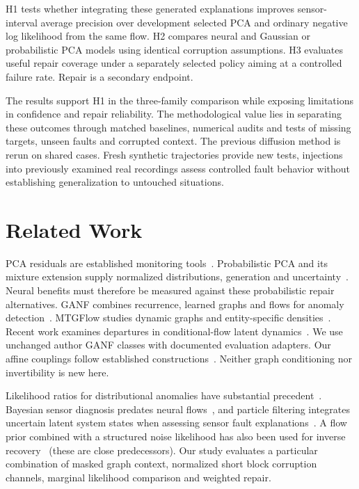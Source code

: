 \documentclass[conference]{IEEEtran}
\newcommand{\1}{\mathbf{1}}
\begin{document}
H1 tests whether integrating these generated explanations improves sensor-interval average precision over development selected PCA and ordinary negative log likelihood from the same flow. H2 compares neural and Gaussian or probabilistic PCA models using identical corruption assumptions. H3 evaluates useful repair coverage under a separately selected policy aiming at a controlled failure rate. Repair is a secondary endpoint.

The results support H1 in the three-family comparison while exposing limitations in confidence and repair reliability. The methodological value lies in separating these outcomes through matched baselines, numerical audits and tests of missing targets, unseen faults and corrupted context. The previous diffusion method is rerun on shared cases. Fresh synthetic trajectories provide new tests, injections into previously examined real recordings assess controlled fault behavior without establishing generalization to untouched situations.



\section{Related Work}
PCA residuals are established monitoring tools~\cite{pca}. Probabilistic PCA and its mixture extension supply normalized distributions, generation and uncertainty~\cite{ppca,mppca}. Neural benefits must therefore be measured against these probabilistic repair alternatives.
GANF combines recurrence, learned graphs and flows for anomaly detection~\cite{ganf}. MTGFlow studies dynamic graphs and entity-specific densities~\cite{mtgflow}. Recent work examines departures in conditional-flow latent dynamics~\cite{latentflow}. We use unchanged author GANF classes with documented evaluation adapters. Our affine couplings follow established constructions~\cite{realnvp}. Neither graph conditioning nor invertibility is new here.

Likelihood ratios for distributional anomalies have substantial precedent~\cite{ratio}. Bayesian sensor diagnosis predates neural flows~\cite{bayesfault}, and particle filtering integrates uncertain latent system states when assessing sensor fault explanations~\cite{wright}. A flow prior combined with a structured noise likelihood has also been used for inverse recovery~\cite{whang} (these are close  predecessors). Our study evaluates a particular combination of masked graph context, normalized short block corruption channels, marginal likelihood comparison and weighted repair. 
\end{document}
